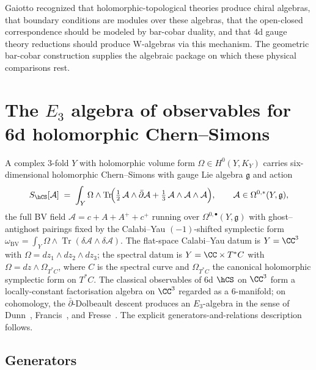 \begin{remark}
Gaiotto recognized that holomorphic-topological theories produce chiral algebras, that boundary conditions are modules over these algebras, that the open-closed correspondence should be modeled by bar-cobar duality, and that 4d gauge theory reductions should produce W-algebras via this mechanism. The geometric bar-cobar construction supplies the algebraic package on which these physical comparisons rest.
\end{remark}

\section{The $E_3$ algebra of observables for 6d holomorphic Chern--Simons}
\label{sec:E3-6d-hCS}

A complex $3$-fold $Y$ with holomorphic volume form $\Omega \in H^0(Y, K_Y)$
carries six-dimensional holomorphic Chern--Simons with gauge Lie algebra
$\mathfrak{g}$ and action
\[
S_{\hCS}[\mathcal{A}] \;=\; \int_Y \Omega \wedge \operatorname{Tr}\!\Bigl(\tfrac{1}{2}\,\mathcal{A} \wedge \bar\partial \mathcal{A} + \tfrac{1}{3}\,\mathcal{A}\wedge\mathcal{A}\wedge\mathcal{A}\Bigr),
\qquad \mathcal{A}\in \Omega^{0,*}(Y,\mathfrak{g}),
\]
the full BV field $\mathcal{A}=c + A + A^+ + c^+$ running over
$\Omega^{0,\bullet}(Y,\mathfrak{g})$ with ghost--antighost pairings fixed by
the Calabi--Yau $(-1)$-shifted symplectic form $\omega_{\mathrm{BV}} = \int_Y
\Omega \wedge \operatorname{Tr}(\delta\mathcal{A}\wedge \delta\mathcal{A})$.
The flat-space Calabi--Yau datum is $Y = \CC^3$ with $\Omega = dz_1\wedge dz_2\wedge dz_3$;
the spectral datum is $Y = \CC \times T^*C$ with $\Omega = dz \wedge \Omega_{T^*C}$,
where $C$ is the spectral curve and $\Omega_{T^*C}$ the canonical
holomorphic symplectic form on $T^*C$. The classical observables of 6d
$\hCS$ on $\CC^3$ form a locally-constant factorisation algebra on $\CC^3$
regarded as a $6$-manifold; on cohomology, the $\bar\partial$-Dolbeault
descent produces an $E_3$-algebra in the sense of
Dunn~\cite{Dunn88}, Francis~\cite{francis2013tangent}, and
Fresse~\cite{fresse-book}. The explicit generators-and-relations
description follows.

\subsection{Generators}
\label{subsec:E3-generators}

